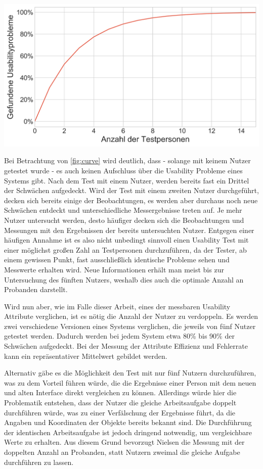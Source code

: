 \begin{center}
  \includegraphics[width=0.7\linewidth]{figures/curve.png}
  \label{fig:curve}
\end{center}

Bei Betrachtung von \cref{fig:curve} wird deutlich, dass - solange mit keinem Nutzer getestet wurde - es auch keinen Aufschluss über die Usability Probleme eines Systems gibt.
Nach dem Test mit einem Nutzer, werden bereits fast ein Drittel der Schwächen aufgedeckt.
Wird der Test mit einem zweiten Nutzer durchgeführt, decken sich bereits einige der Beobachtungen, es werden aber durchaus noch neue Schwächen entdeckt und unterschiedliche Messergebnisse treten auf.
Je mehr Nutzer untersucht werden, desto häufiger decken sich die Beobachtungen und Messungen mit den Ergebnissen der bereits untersuchten Nutzer.\cite{.h}
Entgegen einer häufigen Annahme ist es also nicht unbedingt sinnvoll einen Usability Test mit einer möglichst großen Zahl an Testpersonen durchzuführen, da der Tester, ab einem gewissen Punkt, fast ausschließlich identische Probleme sehen und Messwerte erhalten wird.
Neue Informationen erhält man meist bis zur Untersuchung des fünften Nutzers, weshalb dies auch die optimale Anzahl an Probanden darstellt.

Wird nun aber, wie im Falle dieser Arbeit, eines der messbaren Usability Attribute verglichen, ist es nötig die Anzahl der Nutzer zu verdoppeln.
Es werden zwei verschiedene Versionen eines Systems verglichen, die jeweils von fünf Nutzer getestet werden.
Dadurch werden bei jedem System etwa 80\% bis 90\% der Schwächen aufgedeckt.
Bei der Messung der Attribute Effizienz und Fehlerrate kann ein repräsentativer Mittelwert gebildet werden.

Alternativ gäbe es die Möglichkeit den Test mit nur fünf Nutzern durchzuführen, was zu dem Vorteil führen würde, die die Ergebnisse einer Person mit dem neuen und alten Interface direkt vergleichen zu können.
Allerdings würde hier die Problematik entstehen, dass der Nutzer die gleiche Arbeitsaufgabe doppelt durchführen würde, was zu einer Verfälschung der Ergebnisse führt, da die Angaben und Koordinaten der Objekte bereits bekannt sind.
Die Durchführung der identischen Arbeitsaufgabe ist jedoch dringend notwendig, um vergleichbare Werte zu erhalten.
Aus diesem Grund bevorzugt Nielsen die Messung mit der doppelten Anzahl an Probanden, statt Nutzern zweimal die gleiche Aufgabe durchführen zu lassen.\cite{.h}

